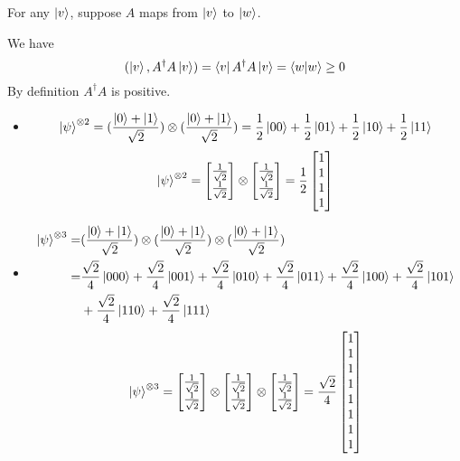 \documentclass{homeworg}
\begin{document}
\exercise*
For any $\ket{v}$, suppose $A$ maps from $\ket{v}$ to $\ket{w}$.

We have
\[(\ket{v},A^\dagger A\ket{v})=\bra{v}A^\dagger A\ket{v}=\braket{w|w}\geq 0\]
By definition $A^\dagger A$ is positive.
\exercise*
\begin{itemize}
    \item 
    \[\ket{\psi}^{\otimes 2}=(\frac{\ket{0}+\ket{1}}{\sqrt{2}})\otimes(\frac{\ket{0}+\ket{1}}{\sqrt{2}})=\frac{1}{2}\ket{00}+\frac{1}{2}\ket{01}+\frac{1}{2}\ket{10}+\frac{1}{2}\ket{11}\]
    \[\ket{\psi}^{\otimes 2}=\begin{bmatrix} \frac{1}{\sqrt{2}} \\ \frac{1}{\sqrt{2}} \end{bmatrix}\otimes\begin{bmatrix} \frac{1}{\sqrt{2}} \\ \frac{1}{\sqrt{2}} \end{bmatrix}=\frac{1}{2}\begin{bmatrix} 1 \\ 1\\ 1\\ 1 \end{bmatrix}\]
    \item
    \begin{align}
        \ket{\psi}^{\otimes 3}=&(\frac{\ket{0}+\ket{1}}{\sqrt{2}})\otimes(\frac{\ket{0}+\ket{1}}{\sqrt{2}})\otimes(\frac{\ket{0}+\ket{1}}{\sqrt{2}})\nonumber\\
        =&\frac{\sqrt{2}}{4}\ket{000}+\frac{\sqrt{2}}{4}\ket{001}+\frac{\sqrt{2}}{4}\ket{010}+\frac{\sqrt{2}}{4}\ket{011}+\frac{\sqrt{2}}{4}\ket{100}+\frac{\sqrt{2}}{4}\ket{101}\nonumber\\
        &+\frac{\sqrt{2}}{4}\ket{110}+\frac{\sqrt{2}}{4}\ket{111}\nonumber
    \end{align}
    \[\ket{\psi}^{\otimes 3}=\begin{bmatrix} \frac{1}{\sqrt{2}} \\ \frac{1}{\sqrt{2}} \end{bmatrix}\otimes\begin{bmatrix} \frac{1}{\sqrt{2}} \\ \frac{1}{\sqrt{2}} \end{bmatrix}\otimes\begin{bmatrix} \frac{1}{\sqrt{2}} \\ \frac{1}{\sqrt{2}} \end{bmatrix}=\frac{\sqrt{2}}{4}\begin{bmatrix} 1 \\ 1\\ 1\\ 1\\ 1 \\ 1\\ 1 \\ 1 \end{bmatrix}\]
\end{itemize}
\end{document}
